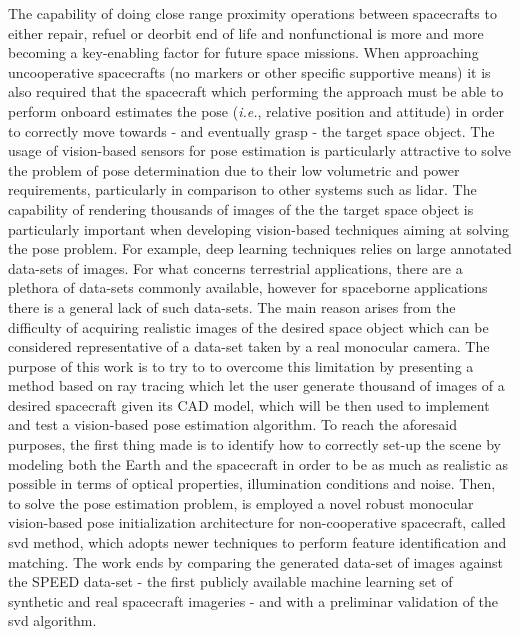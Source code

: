 
The capability of doing close range proximity operations between spacecrafts to either repair, refuel or deorbit end of life and nonfunctional is more and more becoming a key-enabling factor for future space missions. When approaching uncooperative spacecrafts (no markers or other specific supportive means) it is also required that the spacecraft which performing the approach must be able to perform onboard estimates the pose (\textit{i.e.}, relative position and attitude) in order to correctly move towards - and eventually grasp - the target space object. The usage of vision-based sensors for pose estimation is particularly attractive to solve the problem of pose determination due to their low volumetric and power requirements, particularly in comparison to other systems such as \acrshort{lidar}. The capability of rendering thousands of images of the the target space object is particularly important when developing vision-based techniques aiming at solving the pose problem. For example, deep learning techniques relies on large annotated data-sets of images. For what concerns terrestrial applications, there are a plethora of data-sets commonly available, however for spaceborne applications there is a general lack of such data-sets. The main reason arises from the difficulty of acquiring realistic images of the desired space object which can be considered representative of a data-set taken by a real monocular camera. 
The purpose of this work is to try to to overcome this limitation by presenting a method based on ray tracing which let the user generate thousand of images of a desired spacecraft given its CAD model, which will be then used to implement and test a vision-based pose estimation algorithm.
To reach the aforesaid purposes, the first thing made is to identify how to correctly set-up the scene by modeling both the Earth and the spacecraft in order to be as much as realistic as possible in terms of  optical properties, illumination conditions and noise. Then, to solve the pose estimation problem, is employed a novel robust monocular vision-based pose initialization architecture for non-cooperative spacecraft, called \acrshort{svd} method, which adopts newer techniques to perform feature identification and matching. The work ends by comparing the generated data-set of images against the SPEED data-set - the first publicly available machine learning set of synthetic and real spacecraft imageries - and with a preliminar validation of the \acrshort{svd} algorithm.